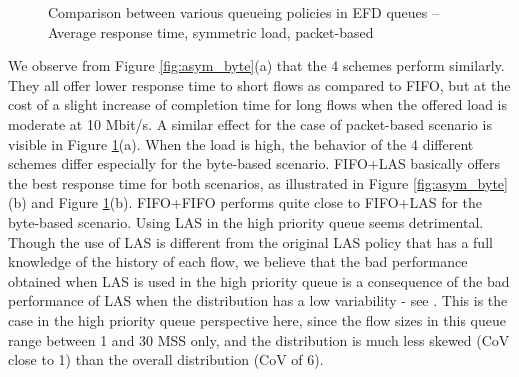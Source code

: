 \documentclass[preprint,12pt]{elsarticle}
\begin{document}
\begin{figure}[ht!]
  \centering
  \caption{Comparison between various queueing policies in EFD  queues -- Average response time, symmetric load, packet-based}
  \label{fig:asym_pkt}
\end{figure}

We observe from Figure \ref{fig:asym_byte}(a) that the 4 schemes perform similarly. They all offer lower response time to short flows as compared to FIFO, but at the cost of  a slight increase of completion time for long flows when the offered load is moderate at 10 Mbit/s. A similar effect for the case of packet-based scenario is visible in Figure \ref{fig:asym_pkt}(a). When the load is high, the behavior of the 4 different schemes differ especially for the byte-based scenario. FIFO+LAS basically offers the best response time for both scenarios, as illustrated in Figure \ref{fig:asym_byte}(b) and Figure \ref{fig:asym_pkt}(b). FIFO+FIFO performs quite close to FIFO+LAS for the byte-based scenario. Using LAS in the high priority queue seems  detrimental. Though the use of LAS is different from the original LAS policy that has a full knowledge of the history of each flow, we believe that the bad performance obtained when LAS is used in the high priority queue is a consequence of the bad performance of LAS when the distribution has a low variability - see \cite{kleinrock_76_queueing}. This is the case in the high  priority queue perspective here, since the flow sizes in this queue range  between 1 and 30 MSS only, and the distribution is much less skewed (CoV close to 1) than the overall distribution (CoV of 6).  
\end{document}
